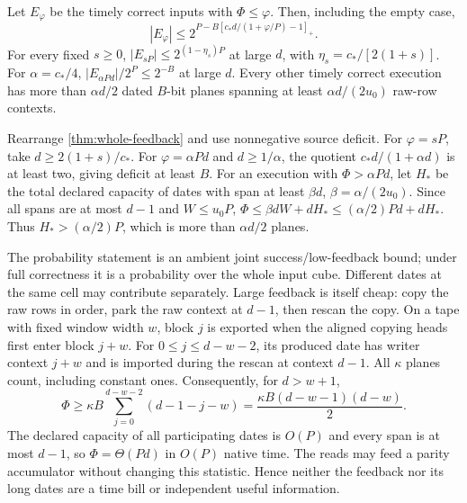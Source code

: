 \begin{corollary}\label{cor:feedback-tail}
Let $E_\varphi$ be the timely correct inputs with $\Phi\le\varphi$.
Then, including the empty case,
\[
 |E_\varphi|\le2^{P-B[c_*d/(1+\varphi/P)-1]_+}.
\]
For every fixed $s\ge0$, $|E_{sP}|\le2^{(1-\eta_s)P}$ at large $d$,
with $\eta_s=c_*/[2(1+s)]$. For $\alpha=c_*/4$,
$|E_{\alpha Pd}|/2^P\le2^{-B}$ at large $d$.
Every other timely correct execution has more than $\alpha d/2$ dated
$B$-bit planes spanning at least $\alpha d/(2u_0)$ raw-row contexts.
\end{corollary}
\begin{informalproof}
Rearrange \cref{thm:whole-feedback} and use nonnegative source deficit.
For $\varphi=sP$, take $d\ge2(1+s)/c_*$. For
$\varphi=\alpha Pd$ and $d\ge1/\alpha$, the quotient
$c_*d/(1+\alpha d)$ is at least two, giving deficit at least $B$.
For an execution with $\Phi>\alpha Pd$, let $H_*$ be the total declared
capacity of dates with span at least $\beta d$, $\beta=\alpha/(2u_0)$.
Since all spans are at most $d-1$ and $W\le u_0P$,
$\Phi\le\beta dW+dH_*\le(\alpha/2)Pd+dH_*$.
Thus $H_*>(\alpha/2)P$, which is more than $\alpha d/2$ planes.
\end{informalproof}

The probability statement is an ambient joint success/low-feedback bound;
under full correctness it is a probability over the whole input cube.
Different dates at the same cell may contribute separately. Large feedback
is itself cheap: copy the raw rows in order, park the raw context at $d-1$,
then rescan the copy. On a tape with fixed window width $w$, block $j$
is exported when the aligned copying heads first enter block $j+w$.
For $0\le j\le d-w-2$, its produced date has writer context $j+w$ and
is imported during the rescan at context $d-1$. All $\kappa$ planes
count, including constant ones. Consequently, for $d>w+1$,
\[
 \Phi\ge\kappa B\sum_{j=0}^{d-w-2}(d-1-j-w)
       =\frac{\kappa B(d-w-1)(d-w)}2.
\]
The declared capacity of all participating dates is $O(P)$ and every span
is at most $d-1$, so $\Phi=\Theta(Pd)$ in $O(P)$ native time.
The reads may feed a parity accumulator without changing this statistic.
Hence neither the feedback nor its long dates are a time bill or independent
useful information.

